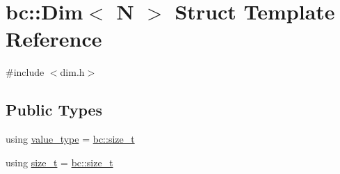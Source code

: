 \hypertarget{structbc_1_1Dim}{}\section{bc\+:\+:Dim$<$ N $>$ Struct Template Reference}
\label{structbc_1_1Dim}


{\ttfamily \#include $<$dim.\+h$>$}

\subsection*{Public Types}
\begin{DoxyCompactItemize}
\item 
using \hyperlink{structbc_1_1Dim_af59ff554825273cf6bd9619b2c78c196}{value\+\_\+type} = \hyperlink{namespacebc_aaf8e3fbf99b04b1b57c4f80c6f55d3c5}{bc\+::size\+\_\+t}
\item 
using \hyperlink{structbc_1_1Dim_a8c7c7ae0cd96c3923e76097089747290}{size\+\_\+t} = \hyperlink{namespacebc_aaf8e3fbf99b04b1b57c4f80c6f55d3c5}{bc\+::size\+\_\+t}
\end{DoxyCompactItemize}
